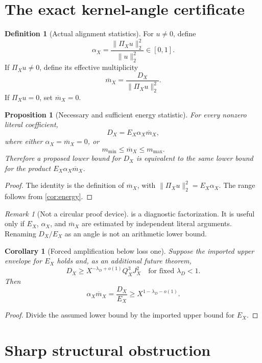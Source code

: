 \documentclass[11pt,a4paper]{article}
\newtheorem{proposition}[theorem]{Proposition}
\newtheorem{corollary}[theorem]{Corollary}
\theoremstyle{definition}
\newtheorem{definition}[theorem]{Definition}
\theoremstyle{remark}
\newtheorem{remark}[theorem]{Remark}
\begin{document}
\section{The exact kernel-angle certificate}

\begin{definition}[Actual alignment statistics]
For \(u\ne0\), define
\[
 \alpha_X=\frac{\|\Pi_Xu\|_2^2}{\|u\|_2^2}\in[0,1].
\]
If \(\Pi_Xu\ne0\), define its effective multiplicity
\[
 \overline m_X
 =\frac{D_X}{\|\Pi_Xu\|_2^2}.
\]
If \(\Pi_Xu=0\), set \(\overline m_X=0\).
\end{definition}

\begin{proposition}[Necessary and sufficient energy statistic]
\label{prop:criterion}
For every nonzero literal coefficient,
\[
 \boxed{D_X=E_X\alpha_X\overline m_X,}
\]
where either \(\alpha_X=\overline m_X=0\), or
\[
 m_{\min}\le\overline m_X\le m_{\max}.
\]
Therefore a proposed lower bound for \(D_X\) is equivalent to the
same lower bound for the product
\(E_X\alpha_X\overline m_X\).
\end{proposition}

\begin{proof}
The identity is the definition of \(\overline m_X\), with
\(\|\Pi_Xu\|_2^2=E_X\alpha_X\).  The range follows from
\cref{cor:energy}.
\end{proof}

\begin{remark}[Not a circular proof device]
 is a diagnostic factorization.  It is useful
only if \(E_X\), \(\alpha_X\), and \(\overline m_X\) are estimated by
independent literal arguments.  Renaming \(D_X/E_X\) as an angle is
not an arithmetic lower bound.
\end{remark}

\begin{corollary}[Forced amplification below loss one]
\label{cor:amplification}
Suppose the imported upper envelope for \(E_X\) holds and, as an
additional future theorem,
\[
 D_X\ge X^{-\lambda_D+o(1)}Q_X^3J_X^2
\quad\text{for fixed }\lambda_D<1.
\]
Then
\[
 \boxed{
 \alpha_X\overline m_X
 =\frac{D_X}{E_X}
 \ge X^{1-\lambda_D-o(1)}.}
\]
\end{corollary}

\begin{proof}
Divide the assumed lower bound by the imported upper bound for
\(E_X\).
\end{proof}

\section{Sharp structural obstruction}
\end{document}
